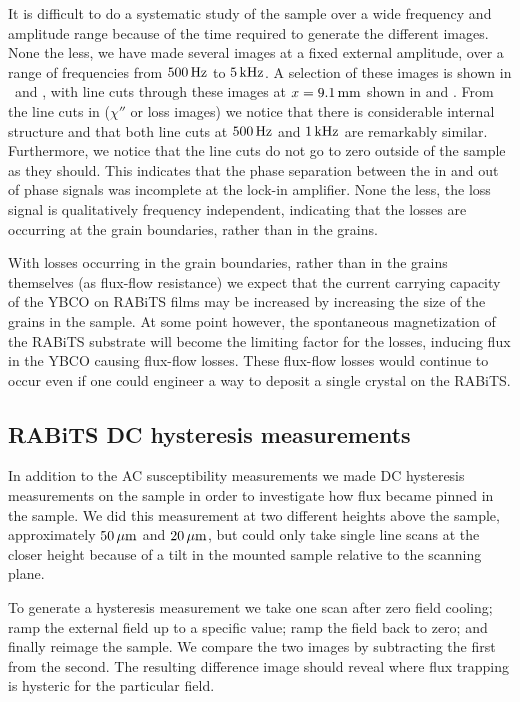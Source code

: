 It is difficult to do a systematic study of the sample over a wide
frequency and amplitude range because of the time required to generate
the different images. None the less, we have made several images
at a fixed external amplitude, over a range of frequencies from
$500\,\mathrm{Hz}$ to $5\,\mathrm{kHz}$. A selection of these images is shown in 
\ and 
, with line cuts through these images at
$x=9.1\,\mathrm{mm}$ shown in 
and . From the line
cuts in  ($\chi''$ or loss images)
we notice that there is considerable internal structure and that 
both line cuts at $500\,\mathrm{Hz}$ and $1\,\mathrm{kHz}$ are remarkably similar. 
Furthermore, we notice that the line cuts do not go to zero outside of the
sample as they should. This indicates that the phase separation between
the in and out of phase signals was incomplete at the lock-in amplifier.
None the less, the loss signal is qualitatively 
frequency independent, indicating that
the losses are occurring at the grain boundaries, rather than in the grains. 

With losses occurring in the grain boundaries, rather than in the 
grains themselves (as flux-flow resistance) we expect that the current
carrying capacity of the YBCO on RABiTS films may be increased by increasing
the size of the grains in the sample. At some point however, the spontaneous
magnetization of the RABiTS substrate will become the limiting factor
for the losses, inducing flux in the YBCO causing flux-flow losses. 
These flux-flow losses would continue to occur even if one could 
engineer a way to deposit a single crystal on the RABiTS. 


%
%
\subsection{RABiTS DC hysteresis measurements}
\label{sec:rabits_dc_hyst}

In addition to the AC susceptibility measurements we made DC 
hysteresis measurements on the sample in order to investigate
how flux became pinned in the sample. We did this measurement
at two different heights above the sample, approximately $50\,\mu\mathrm{m}$
and $20\,\mu\mathrm{m}$, but could only take single line scans at the
closer height because of a tilt in the mounted sample relative
to the scanning plane. 

To generate a hysteresis measurement we take one scan after
zero field cooling; ramp the external field up to a specific
value; ramp the field back to zero; and finally reimage the sample. 
We compare the two images by subtracting the first from the 
second. The resulting difference image should reveal where flux
trapping is hysteric for the particular field.

